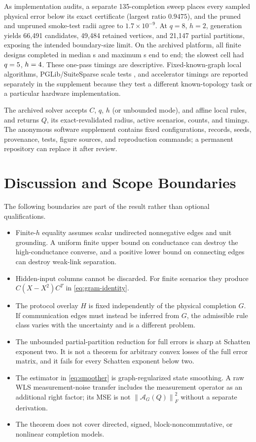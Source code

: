\documentclass[journal,10pt]{IEEEtran}
\theoremstyle{definition}
\theoremstyle{remark}
\newcommand{\cA}{\mathcal A}
\newcommand{\norm}[1]{\left\lVert #1\right\rVert}
\begin{document}
As implementation audits, a separate 135-completion sweep places every sampled
physical error below its exact certificate (largest ratio $0.9475$), and the
pruned and unpruned smoke-test radii agree to $1.7\times10^{-9}$.  At $q=8$,
$h=2$, generation yields 66,491 candidates, 49,484 retained vertices, and
21,147 partial partitions, exposing the intended boundary-size limit.
On the archived platform, all \CoreProblemCount{} finite designs completed in
median \CoreExactMedianTotalSeconds{} s and maximum
\CoreExactMaxTotalSeconds{} s end to end; the slowest cell had
$q=5$, $h=4$.  These one-pass timings are descriptive.
Fixed-known-graph local algorithms, PGLib/SuiteSparse scale tests
\cite{babaeinejadsarookolaee2019pglib,davis2011suitesparse}, and accelerator
timings are reported separately in the supplement because they test a
different known-topology task or a particular hardware implementation.

The archived solver accepts $C$, $q$, $h$ (or unbounded mode), and affine local
rules, and returns $Q$, its exact-revalidated radius, active scenarios, counts,
and timings.  The anonymous software supplement contains fixed configurations,
records, seeds, provenance, tests, figure sources, and reproduction commands;
a permanent repository can replace it after review.

\section{Discussion and Scope Boundaries}

The following boundaries are part of the result rather than optional
qualifications.

\begin{itemize}[leftmargin=1.5em]
\item Finite-$h$ equality assumes scalar undirected nonnegative edges and unit
grounding.  A uniform finite upper bound on conductance can destroy the
high-conductance converse, and a positive lower bound on connecting edges can
destroy weak-link separation.
\item Hidden-input columns cannot be discarded.  For finite scenarios they
produce $C(X-X^2)C^T$ in \eqref{eq:gram-identity}.
\item The protocol overlay $H$ is fixed independently of the physical
completion $G$.  If communication edges must instead be inferred from $G$,
the admissible rule class varies with the uncertainty and is a different
problem.
\item The unbounded partial-partition reduction for full errors is sharp at
Schatten exponent two.  It is not a theorem for arbitrary convex losses of the
full error matrix, and it fails for every Schatten exponent below two.
\item The estimator in \eqref{eq:smoother} is graph-regularized state
smoothing.  A raw WLS measurement-noise transfer includes the measurement
operator as an additional right factor; its MSE is not
$\norm{\cA_G(Q)}_F^2$ without a separate derivation.
\item The theorem does not cover directed, signed, block-noncommutative, or
nonlinear completion models.
\end{itemize}
\end{document}

